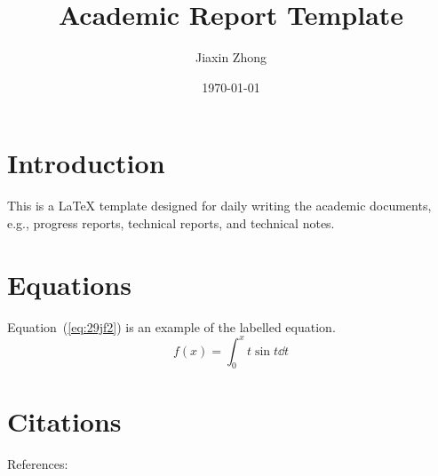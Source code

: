 \documentclass{article}
\title{Academic Report Template}
\author{Jiaxin Zhong}
\date{\today}
\begin{document}
\maketitle
\thispagestyle{firststyle}

\section{Introduction}
This is a \LaTeX{} template designed for daily writing the academic documents, e.g., progress reports, technical reports, and technical notes.

\lipsum[1]

\lipsum[2]

\lipsum[3]

\lipsum[4]

\lipsum[5]

\lipsum[6]

\section{Equations}
Equation~(\ref{eq:29jf2}) is an example of the labelled equation.
\begin{equation}
    f(x) = \int_0^x t\sin t \dd t
    \label{eq:29jf2}
\end{equation}

\section{Citations}
References: \cite{Zhong2020InsertionLossThin}





\end{document}
